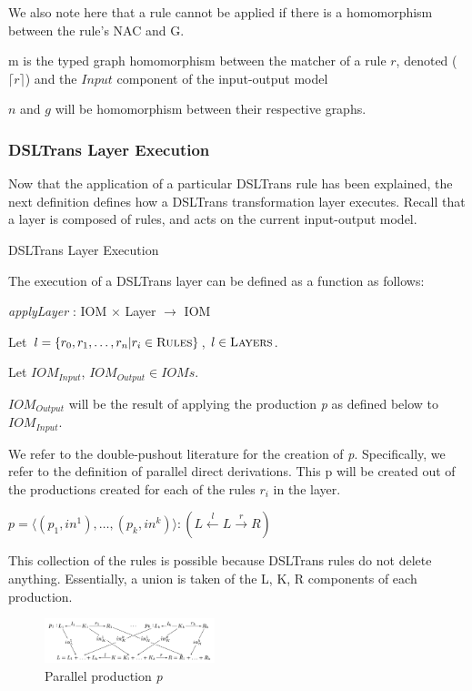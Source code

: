 We also note here that a rule cannot be applied if there is a homomorphism between the rule's NAC and G. 

m is the typed graph homomorphism between the matcher of a rule $r$, denoted ($\lceil r \rceil$) and the $\mathit{Input}$ component of the input-output model

$n$ and $g$ will be homomorphism between their respective graphs. 

\subsubsection*{DSLTrans Layer Execution}

Now that the application of a particular DSLTrans rule has been explained, the next definition defines how a DSLTrans transformation layer executes. Recall that a layer is composed of rules, and acts on the current input-output model.


\begin{definition} {DSLTrans Layer Execution}
\label{def:dsltrans_layer_execution}


The execution of a DSLTrans layer can be defined as a function as follows:

\textit{applyLayer} : IOM $\times$ Layer $\rightarrow$ IOM

Let $l = \{r_0, r_1, \dots, r_n | r_i \in \textsc{Rules}\}$, $l \in \textsc{Layers}$.

Let $\mathit{IOM}_{Input}$, $\mathit{IOM}_{Output} \in \mathit{IOMs}$.

$\mathit{IOM}_{Output}$ will be the result of applying the production \textit{p} as defined below to $\mathit{IOM}_{Input}.$

We refer to the double-pushout literature for the creation of \textit{p}. Specifically, we refer to the definition of parallel direct derivations. This p will be created out of the productions created for each of the rules $r_i$ in the layer.

$p = \big\langle (p_1, {in}^1), \dots, (p_k, {in}^k) \big\rangle : (L \xleftarrow{l} L \xrightarrow{r} R)$

This collection of the rules is possible because DSLTrans rules do not delete anything. Essentially, a union is taken of the L, K, R components of each production.
\end{definition}

\begin{figure}[h!] \centering
\includegraphics[width=0.44\textwidth]{figures/formal/parallel_productions}
	\caption{Parallel production \textit{p}}
	\label{fig:parallel_productions}
\end{figure}


